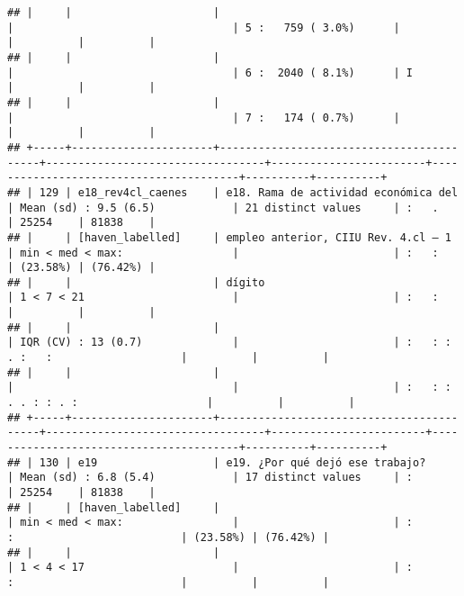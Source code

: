\documentclass[]{article}
\begin{document}
\begin{verbatim}
## |     |                      |                                          |                                  | 5 :   759 ( 3.0%)      |                                        |          |          |
## |     |                      |                                          |                                  | 6 :  2040 ( 8.1%)      | I                                      |          |          |
## |     |                      |                                          |                                  | 7 :   174 ( 0.7%)      |                                        |          |          |
## +-----+----------------------+------------------------------------------+----------------------------------+------------------------+----------------------------------------+----------+----------+
## | 129 | e18_rev4cl_caenes    | e18. Rama de actividad económica del     | Mean (sd) : 9.5 (6.5)            | 21 distinct values     | :   .                                  | 25254    | 81838    |
## |     | [haven_labelled]     | empleo anterior, CIIU Rev. 4.cl – 1      | min < med < max:                 |                        | :   :                                  | (23.58%) | (76.42%) |
## |     |                      | dígito                                   | 1 < 7 < 21                       |                        | :   :                                  |          |          |
## |     |                      |                                          | IQR (CV) : 13 (0.7)              |                        | :   : :     . :   :                    |          |          |
## |     |                      |                                          |                                  |                        | :   : : . . : : . :                    |          |          |
## +-----+----------------------+------------------------------------------+----------------------------------+------------------------+----------------------------------------+----------+----------+
## | 130 | e19                  | e19. ¿Por qué dejó ese trabajo?          | Mean (sd) : 6.8 (5.4)            | 17 distinct values     | :                                      | 25254    | 81838    |
## |     | [haven_labelled]     |                                          | min < med < max:                 |                        | :           :                          | (23.58%) | (76.42%) |
## |     |                      |                                          | 1 < 4 < 17                       |                        | :           :                          |          |          |

\end{verbatim}
\end{document}
